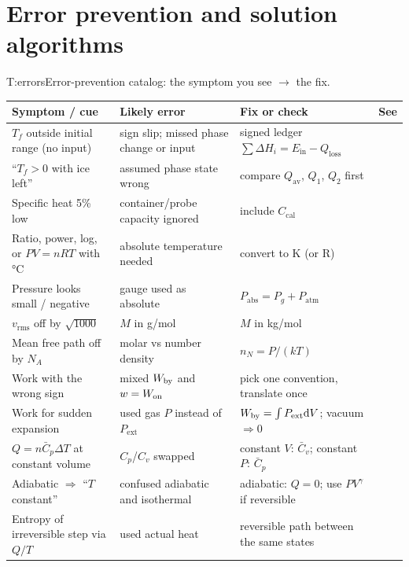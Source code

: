\section{Error prevention and solution algorithms}\label{sec:errors}
\begin{reftab}{T:errors}{Error-prevention catalog: the symptom you see $\to$ the fix.}
\small
\renewcommand{\arraystretch}{1.08}
\begin{tabularx}{\textwidth}{@{}L{0.27\textwidth}L{0.30\textwidth}Yr@{}}
\toprule
Symptom / cue & Likely error & Fix or check & See\\
\midrule
$T_f$ outside initial range (no input) & sign slip; missed phase change or input & signed ledger $\sum\Delta H_i=E_{\text{in}}-Q_{\text{loss}}$ & \\
``$T_f>0$ with ice left'' & assumed phase state wrong & compare $Q_{\text{av}}$, $Q_1$, $Q_2$ first & \\
Specific heat 5\% low & container/probe capacity ignored & include $C_{\text{cal}}$ & \\
Ratio, power, log, or $PV=nRT$ with \si{\celsius} & absolute temperature needed & convert to K (or R) & \\
Pressure looks small / negative & gauge used as absolute & $P_{\text{abs}}=P_g+P_{\text{atm}}$ & \\
$v_{\text{rms}}$ off by $\sqrt{1000}$ & $M$ in g/mol & $M$ in \si{kg/mol} & \\
Mean free path off by $N_A$ & molar vs number density & $n_N=P/(kT)$ & \\
Work with the wrong sign & mixed $W_{\mathrm{by}}$ and $w=W_{\mathrm{on}}$ & pick one convention, translate once & \\
Work for sudden expansion & used gas $P$ instead of $P_{\text{ext}}$ & $W_{\mathrm{by}}=\int P_{\text{ext}}\mathrm{d} V$; vacuum $\Rightarrow0$ & \\
$Q=n\bar C_p\Delta T$ at constant volume & $C_p$/$C_v$ swapped & constant $V$: $\bar C_v$; constant $P$: $\bar C_p$ & \\
Adiabatic $\Rightarrow$ ``$T$ constant'' & confused adiabatic and isothermal & adiabatic: $Q=0$; use $PV^\gamma$ if reversible & \\
Entropy of irreversible step via $Q/T$ & used actual heat & reversible path between the same states & \\

\end{tabularx}
\end{reftab}
